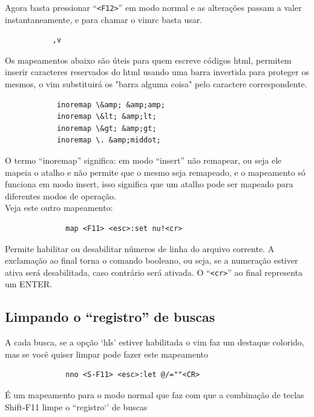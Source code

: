 \documentclass[10pt,a4paper,openany]{book}
\begin{document}
Agora basta pressionar ``\verb|<F12>|'' em modo normal e as alterações passam a valer
instantaneamente, e para chamar o vimrc basta usar.

\begin{verbatim}
		   ,v
\end{verbatim}



Os mapeamentos abaixo são úteis
para quem escreve códigos html, permitem inserir caracteres reservados do html
usando uma barra invertida para proteger os mesmos, o vim substituirá os "barra
alguma coisa" pelo caractere correspondente.

\begin{verbatim}
			inoremap \&amp; &amp;amp;
			inoremap \&lt; &amp;lt;
			inoremap \&gt; &amp;gt;
			inoremap \. &amp;middot;
\end{verbatim}

O termo ``inoremap'' significa: em modo ``insert'' não remapear, ou seja
ele mapeia o atalho e não permite que o mesmo seja remapeado, e o
mapeamento só funciona em modo insert, isso significa que um atalho
pode ser mapeado para diferentes modos de operação. \\


Veja este outro mapeamento:

\begin{verbatim}
			  map <F11> <esc>:set nu!<cr>
\end{verbatim}

Permite habilitar ou desabilitar números de linha do arquivo corrente.
A exclamação ao final torna o comando booleano, ou seja, se a
numeração estiver ativa será desabilitada, caso contrário será
ativada. O ``\verb|<cr>|'' ao final representa um ENTER.

\subsection{Limpando o ``registro'' de buscas}\label{Limpando o ``registro'' de buscas}

A cada busca, se a opção `hls' estiver habilitada o vim faz um
destaque colorido, mas se você quiser limpar pode fazer este
mapeamento

\begin{verbatim}
			  nno <S-F11> <esc>:let @/=""<CR>
\end{verbatim}

É um mapeamento para o modo normal que faz com que a combinação de
teclas Shift-F11 limpe o ``registro`' de buscas
\end{document}
